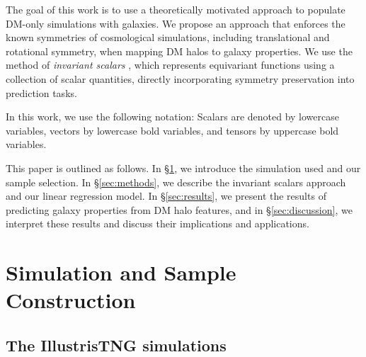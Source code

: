 The goal of this work is to use a theoretically motivated approach to populate DM-only simulations with galaxies.
We propose an approach that enforces the known symmetries of cosmological simulations, including translational and rotational symmetry, when mapping DM halos to galaxy properties.
We use the method of \emph{invariant scalars} \citep{Villar2021a}, which represents equivariant functions using a collection of scalar quantities, directly incorporating symmetry preservation into prediction tasks.

In this work, we use the following notation: 
Scalars are denoted by lowercase variables, vectors by lowercase bold variables, and tensors by uppercase bold variables.

This paper is outlined as follows.
In \S\ref{sec:sim_sample}, we introduce the simulation used and our sample selection. 
In \S\ref{sec:methods}, we describe the invariant scalars approach and our linear regression model.
In \S\ref{sec:results}, we present the results of predicting galaxy properties from DM halo features, and in \S\ref{sec:discussion}, we interpret these results and discuss their implications and applications.


\section{Simulation and Sample Construction}
\label{sec:sim_sample}

\subsection{The IllustrisTNG simulations}
\label{sec:tng}

